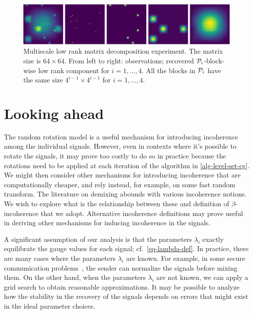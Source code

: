 \begin{figure}[t]
    \centering
    \includegraphics[width=\textwidth]{./figures/Multiscale.pdf}
    \caption{Multiscale low rank matrix decomposition experiment. The matrix size is $64\times64$. From left to right: observations; recovered $\mathcal{P}_i$-block-wise low rank component for $i = 1,\dots,4$. All the blocks in $\mathcal{P}_i$ have the same size $4^{i-1}\times4^{i-1}$ for $i = 1,\dots,4$.}
    \label{fig:multiscale}
\end{figure}

\section{Looking ahead}\label{sec:8}

The random rotation model is a useful mechanism for introducing incoherence among the individual signals. However, even in contexts where it's possible to rotate the signals, it may prove too costly to do so in practice because the rotations need to be applied at each iteration of the algorithm in \autoref{alg-level-set-cg}. We might then consider other mechanisms for introducing incoherence that are computationally cheaper, and rely instead, for example, on some fast random transform. The literature on demixing abounds with various incoherence notions. We wish to explore what is the relationship between these and definition of $\beta$-incoherence that we adopt. Alternative incoherence definitions may prove useful in deriving other mechanisms for inducing incoherence in the signals.

A significant assumption of our analysis is that the parameters $\lambda_i$ exactly equilibrate the gauge values for each signal; cf.~\eqref{eq-lambda-def}. In practice, there are many cases where the parameters $\lambda_i$ are known. For example, in some secure communication problems~\cite[Section~1.3.1]{mccoy2014sharp}, the sender can normalize the signals before mixing them. On the other hand, when the parameters $\lambda_i$ are not known, we can apply a grid search to obtain reasonable approximations. It may be possible to analyze how the stability in the recovery of the signals depends on errors that might exist in the ideal parameter choices.


